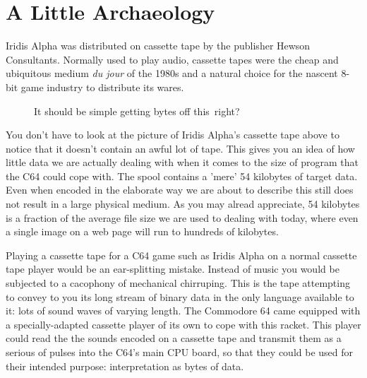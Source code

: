 \chapter{A Little Archaeology} 
\label{sec:archaeo}
\lstset{style=6502Style}


Iridis Alpha was distributed on cassette tape by the publisher Hewson Consultants. Normally used
to play audio, cassette tapes were the cheap and ubiquitous medium \textit{du jour} of the 1980s and a
natural choice for the nascent 8-bit game industry to distribute its wares.

\begin{figure}[H]
  {
    \begin{adjustbox}{width=10cm,center}
    \end{adjustbox}
  }\caption[]{It should be simple getting bytes off this\, right?}
\end{figure}

You don't have to look at the picture of Iridis Alpha's cassette tape above to notice that it doesn't contain
an awful lot of tape. This gives you an idea of how little data we are actually dealing with when it comes
to the size of program that the C64 could cope with. The spool contains a 'mere' 54 kilobytes of target data. Even
when encoded in the elaborate way we are about to describe this still does not result in a large physical
medium. As you may alread appreciate, 54 kilobytes is a fraction of the average file size we are used to
dealing with today, where even a single image on a web page will run to hundreds of kilobytes.

Playing a cassette tape for a C64 game such as Iridis Alpha on a normal cassette tape player would
be an ear-splitting mistake. Instead of music you would be subjected to a cacophony of mechanical
chirruping. This is the tape attempting to convey to you its long stream of binary data in the only
language available to it: lots of sound waves of varying length. The Commodore 64 came equipped
with a specially-adapted cassette player of its own to cope with this racket. This player could read the the sounds encoded
on a cassette tape and transmit them as a serious of pulses into the C64's main CPU board, so that 
they could be used for their intended purpose: interpretation as bytes of data. 

